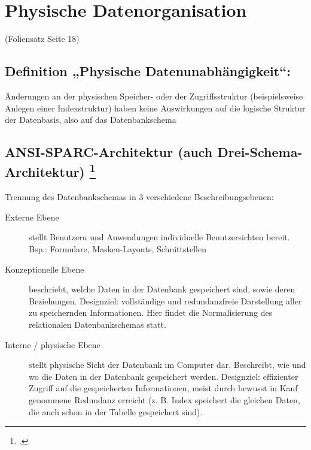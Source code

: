 \documentclass{lehramt-informatik-haupt}
\begin{document}
\chapter{Physische Datenorganisation}

\tableofcontents

(Foliensatz Seite 18)

\section{Definition „Physische Datenunabhängigkeit“:}

\begin{mdframed}
Änderungen an der physischen Speicher- oder der Zugriffsstruktur
(beispielsweise Anlegen einer Indexstruktur) haben keine Auswirkungen
auf die logische Struktur der Datenbasis, also auf das Datenbankschema
\end{mdframed}

%

\section{ANSI-SPARC-Architektur (auch Drei-Schema-Architektur)
\footcite[Seite 443, 13.1.3 Architektur eines Datenbanksystems]{schneider}
}

Trennung des Datenbankschemas in 3 verschiedene Beschreibungsebenen:

\begin{description}
\item[Externe Ebene]

stellt Benutzern und Anwendungen individuelle Benutzersichten bereit.
Bsp.: Formulare, Masken-Layouts, Schnittstellen

\item[Konzeptionelle Ebene]

beschriebt, welche Daten in der Datenbank gespeichert sind, sowie deren
Beziehungen. Designziel: vollständige und redundanzfreie Darstellung
aller zu speichernden Informationen. Hier findet die Normalisierung des
relationalen Datenbankschemas statt.

\item[Interne / physische Ebene]

stellt physische Sicht der Datenbank im Computer dar. Beschreibt, wie
und wo die Daten in der Datenbank gespeichert werden. Designziel:
effizienter Zugriff auf die gespeicherten Informationen, meist durch
bewusst in Kauf genommene Redundanz erreicht (z. B. Index speichert die
gleichen Daten, die auch schon in der Tabelle gespeichert sind).

\end{description}
\end{document}

